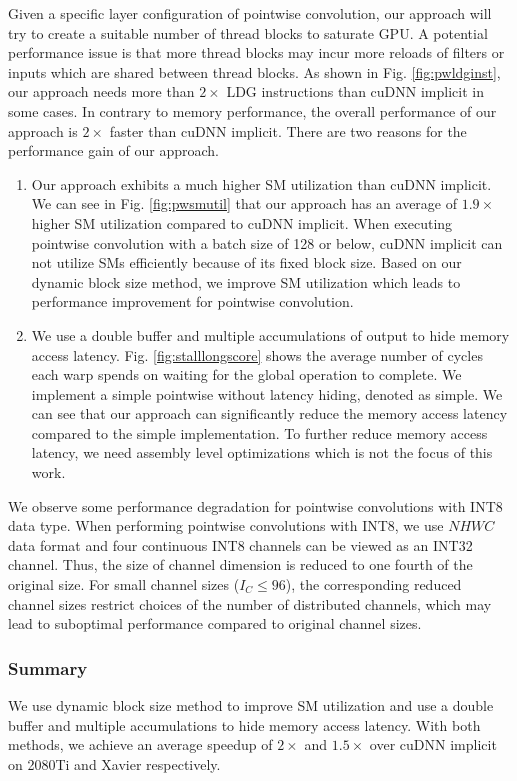 Given a specific layer configuration of pointwise convolution, our approach will try to create a suitable number of thread blocks to saturate GPU.
A potential performance issue is that more thread blocks may incur more reloads of filters or inputs which are shared between thread blocks.
As shown in Fig. \ref{fig:pwldginst}, our approach needs more than $2\times$ LDG instructions than cuDNN implicit in some cases.
In contrary to memory performance, the overall performance of our approach is $2\times$ faster than cuDNN implicit.
There are two reasons for the performance gain of our approach.
\begin{enumerate}
	\item Our approach exhibits a much higher SM utilization than cuDNN implicit.
	We can see in Fig. \ref{fig:pwsmutil} that our approach has an average of $1.9\times$ higher SM utilization compared to cuDNN implicit.
	When executing pointwise convolution with a batch size of 128 or below, cuDNN implicit can not utilize SMs efficiently because of its fixed block size.
	Based on our dynamic block size method, we improve SM utilization which leads to performance improvement for pointwise convolution.
	\item We use a double buffer and multiple accumulations of output to hide memory access latency.
	Fig. \ref{fig:stalllongscore} shows the average number of cycles each warp spends on waiting for the global operation to complete.
	We implement a simple pointwise without latency hiding, denoted as simple.
	We can see that our approach can significantly reduce the memory access latency compared to the simple implementation.
	To further reduce memory access latency, we need assembly level optimizations which is not the focus of this work.
\end{enumerate}

We observe some performance degradation for pointwise convolutions with INT8 data type.
When performing pointwise convolutions with INT8, we use $NHWC$ data format and four continuous INT8 channels can be viewed as an INT32 channel.
Thus, the size of channel dimension is reduced to one fourth of the original size.
For small channel sizes ($I_C \leq 96$), the corresponding reduced channel sizes restrict  choices of the number of distributed channels, which may lead to suboptimal performance compared to original channel sizes.

\subsubsection{Summary} We use dynamic block size method to improve SM utilization and use a double buffer and multiple accumulations to hide memory access latency. With both methods, we achieve an average speedup of $2\times$ and $1.5\times$ over cuDNN implicit on 2080Ti and Xavier respectively.


